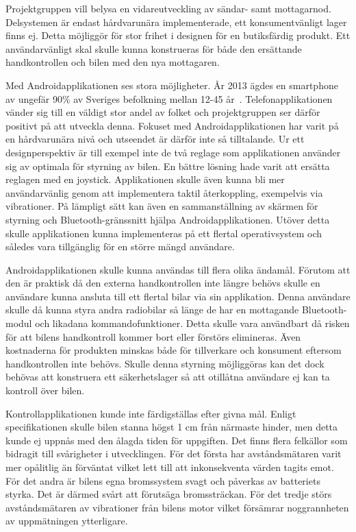 \documentclass[a4paper]{article}
\begin{document}
\vspace{5mm} \noindent
Projektgruppen vill belysa en vidareutveckling av sändar- samt mottagarnod. Delsystemen är endast hårdvarunära implementerade, ett konsumentvänligt lager finns ej. Detta möjliggör för stor frihet i designen för en butiksfärdig produkt. Ett användarvänligt skal skulle kunna konstrueras för både den ersättande handkontrollen och bilen med den nya mottagaren.


\vspace{5mm} \noindent
Med Androidapplikationen ses stora möjligheter. År 2013 ägdes en smartphone av ungefär 90\% av Sveriges befolkning mellan 12-45 år~\cite{smartphoneStat}. Telefonapplikationen vänder sig till en väldigt stor andel av folket och projektgruppen ser därför positivt på att utveckla denna. Fokuset med Androidapplikationen har varit på en hårdvarunära nivå och utseendet är därför inte så tilltalande. Ur ett designperspektiv är till exempel inte de två reglage som applikationen använder sig av optimala för styrning av bilen. En bättre lösning hade varit att ersätta reglagen med en joystick. Applikationen skulle även kunna bli mer användarvänlig genom att implementera taktil återkoppling, exempelvis via vibrationer. På lämpligt sätt kan även en sammanställning av skärmen för styrning och Bluetooth-gränssnitt hjälpa Androidapplikationen. Utöver detta skulle applikationen kunna implementeras på ett flertal operativsystem och således vara tillgänglig för en större mängd användare.

\vspace{5mm} \noindent
Androidapplikationen skulle kunna användas till flera olika ändamål. Förutom att den är praktisk då den externa handkontrollen inte längre behövs skulle en användare kunna ansluta till ett flertal bilar via sin applikation. Denna användare skulle då kunna styra andra radiobilar så länge de har en mottagande Bluetooth-modul och likadana kommandofunktioner. Detta skulle vara användbart då risken för att bilens handkontroll kommer bort eller förstörs elimineras. Även kostnaderna för produkten minskas både för tillverkare och konsument eftersom handkontrollen inte behövs. Skulle denna styrning möjliggöras kan det dock behövas att konstruera ett säkerhetslager så att otillåtna användare ej kan ta kontroll över bilen.



\newpage
\noindent
Kontrollapplikationen kunde inte färdigställas efter givna mål. Enligt specifikationen skulle bilen stanna högst 1 cm från närmaste hinder, men detta kunde ej uppnås med den ålagda tiden för uppgiften. Det finns flera felkällor som bidragit till svårigheter i utvecklingen. För det första har avståndsmätaren varit mer opålitlig än förväntat vilket lett till att inkonsekventa värden tagits emot. För det andra är bilens egna bromssystem svagt och påverkas av batteriets styrka. Det är därmed svårt att förutsäga bromssträckan. För det tredje störs avståndsmätaren av vibrationer från bilens motor vilket försämrar noggrannheten av uppmätningen ytterligare.
\end{document}

